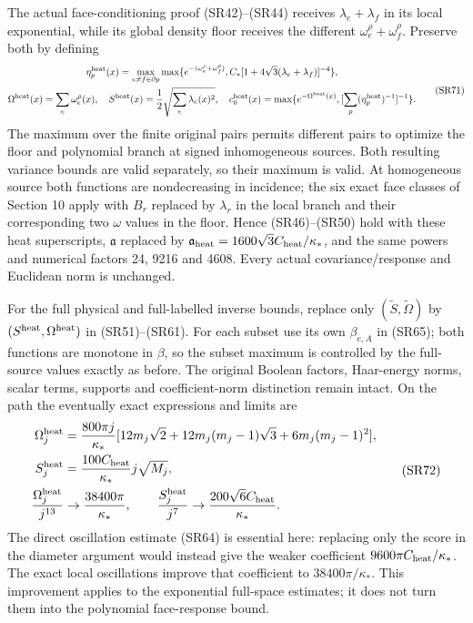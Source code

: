 \documentclass[11pt]{article}
\begin{document}
The actual face-conditioning proof (SR42)–(SR44) receives \(\lambda_e+\lambda_f\) in its local exponential, while its global density floor receives the different \(\omega_e^\rho+\omega_f^\rho\). Preserve both by defining
\[
\begin{gathered}
\eta_p^{\rm heat}(x)=\max_{e\ne f\in\partial p}
\max\{e^{-(\omega_e^\rho+\omega_f^\rho)},
C_*[1+4\sqrt3(\lambda_e+\lambda_f)]^{-4}\},\\
\Omega^{\rm heat}(x)=\sum_e\omega_e^\rho(x),\quad
S^{\rm heat}(x)={1\over2}\sqrt{\sum_e\lambda_e(x)^2},\quad
c_0^{\rm heat}(x)=\max\{e^{-\Omega^{\rm heat}(x)},[\sum_p(\eta_p^{\rm heat})^{-1}]^{-1}\}.
\end{gathered}\tag{SR71}
\]
The maximum over the finite original pairs permits different pairs to optimize the floor and polynomial branch at signed inhomogeneous sources. Both resulting variance bounds are valid separately, so their maximum is valid. At homogeneous source both functions are nondecreasing in incidence; the six exact face classes of Section 10 apply with \(B_r\) replaced by \(\lambda_r\) in the local branch and their corresponding two \(\omega\) values in the floor. Hence (SR46)–(SR50) hold with these heat superscripts, \(\mathfrak a\) replaced by \(\mathfrak a_{\rm heat}=1600\sqrt3C_{\rm heat}/\kappa_*\), and the same powers and numerical factors 24, 9216 and 4608. Every actual covariance/response and Euclidean norm is unchanged.

For the full physical and full-labelled inverse bounds, replace only \((\widetilde S,\widetilde\Omega)\) by \((S^{\rm heat},\Omega^{\rm heat})\) in (SR51)–(SR61). For each subset use its own \(\beta_{e,A}\) in (SR65); both functions are monotone in \(\beta\), so the subset maximum is controlled by the full-source values exactly as before. The original Boolean factors, Haar-energy norms, scalar terms, supports and coefficient-norm distinction remain intact. On the path the eventually exact expressions and limits are
\[
\begin{aligned}
\Omega_j^{\rm heat}
&={800\pi j\over\kappa_*}[12m_j\sqrt2+12m_j(m_j-1)\sqrt3+6m_j(m_j-1)^2],\\
S_j^{\rm heat}&={100C_{\rm heat}\over\kappa_*}j\sqrt{M_j},\\
{\Omega_j^{\rm heat}\over j^{13}}&\to{38400\pi\over\kappa_*},\qquad
{S_j^{\rm heat}\over j^7}\to{200\sqrt6C_{\rm heat}\over\kappa_*}.
\end{aligned}\tag{SR72}
\]
The direct oscillation estimate (SR64) is essential here: replacing only the score in the diameter argument would instead give the weaker coefficient \(9600\pi C_{\rm heat}/\kappa_*\). The exact local oscillations improve that coefficient to \(38400\pi/\kappa_*\). This improvement applies to the exponential full-space estimates; it does not turn them into the polynomial face-response bound.
\end{document}
